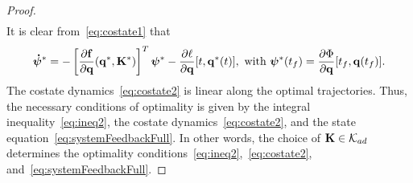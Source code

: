 \documentclass[
12pt,draftcls,onecolumn%
]{IEEEtran}
\begin{document}
\begin{proof}
\begin{multline}
\label{eq:costate1}
\end{multline}
It is clear from~\eqref{eq:costate1} that
\begin{equation}
\boldsymbol{\dot\psi}^* = -\left[\frac{\partial{\bf f}}{\partial{\bf q}}({\bf q}^*,{\bf K}^*)\right]^T\boldsymbol{\psi}^*-\frac{\partial\ell}{\partial{\bf q}}[t,{\bf q}^*(t)],~\text{with}~
\boldsymbol{\psi}^*(t_f) = \frac{\partial\Phi}{\partial{\bf q}}[t_f,{\bf q}(t_f)].
\label{eq:costate2}
\end{equation}
The costate dynamics~\eqref{eq:costate2} is linear along the optimal trajectories. Thus, the necessary conditions of optimality is given by the integral inequality~\eqref{eq:ineq2}, the costate dynamics~\eqref{eq:costate2}, and the state equation~\eqref{eq:systemFeedbackFull}. In other words, the choice of ${\bf K}\in{\cal K}_{ad}$ determines the optimality conditions~\eqref{eq:ineq2},~\eqref{eq:costate2}, and~\eqref{eq:systemFeedbackFull}. 


\end{proof}
\end{document}
